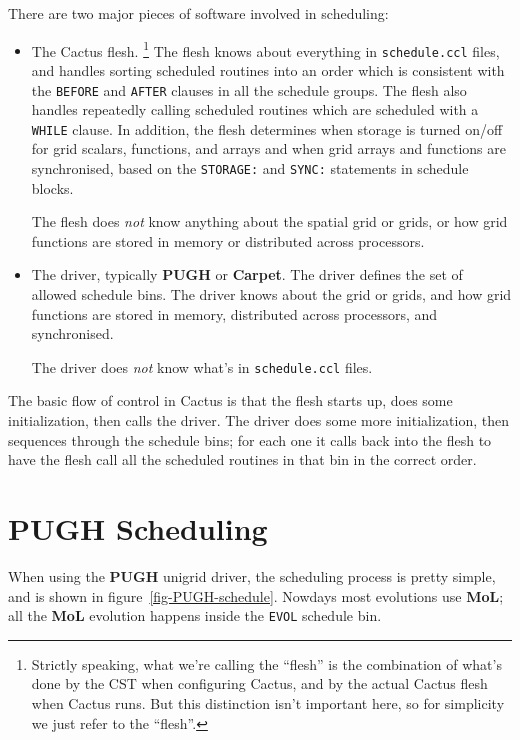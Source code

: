 \documentclass{article}
\def\thorn#1{\textbf{#1}}
\begin{document}
There are two major pieces of software involved in scheduling:
\begin{itemize}
\item	The Cactus flesh.%
\footnote{%
	 Strictly speaking, what we're calling the ``flesh'' is
	 the combination of what's done by the CST when configuring
	 Cactus, and by the actual Cactus flesh when Cactus runs.
	 But this distinction isn't important here, so for simplicity
	 we just refer to the ``flesh''.
	 }%
{}	The flesh knows about everything in \verb|schedule.ccl| files,
	and handles sorting scheduled routines into an order which is
	consistent with the \verb|BEFORE| and \verb|AFTER| clauses in
	all the schedule groups.  The flesh also handles repeatedly
	calling scheduled routines which are scheduled with a
	\verb|WHILE| clause.
        In addition, the flesh determines when storage is turned
        on/off for grid scalars, functions, and arrays and when
        grid arrays and functions are synchronised,
        based on the {\tt STORAGE:} and {\tt SYNC:} statements in
        schedule blocks.

        The flesh does \emph{not} know anything
	about the spatial grid or grids, or how grid functions are
	stored in memory or distributed across processors.
\item	The driver, typically \thorn{PUGH} or \thorn{Carpet}.
	The driver defines the set of allowed schedule bins.
	The driver knows about the grid or grids, and how grid functions
	are stored in memory, distributed across processors, and
        synchronised.

	The driver does \emph{not} know what's in \verb|schedule.ccl| files.
\end{itemize}

The basic flow of control in Cactus is that the flesh starts up, does
some initialization, then calls the driver.  The driver does some
more initialization, then sequences through the schedule bins; for
each one it calls back into the flesh to have the flesh call all the
scheduled routines in that bin in the correct order.


\section{\thorn{PUGH} Scheduling}

When using the \thorn{PUGH} unigrid driver, the scheduling process
is pretty simple, and is shown in figure~\ref{fig-PUGH-schedule}.
Nowdays most evolutions use \thorn{MoL}; all the \thorn{MoL} evolution
happens inside the \verb|EVOL| schedule bin.
\end{document}
